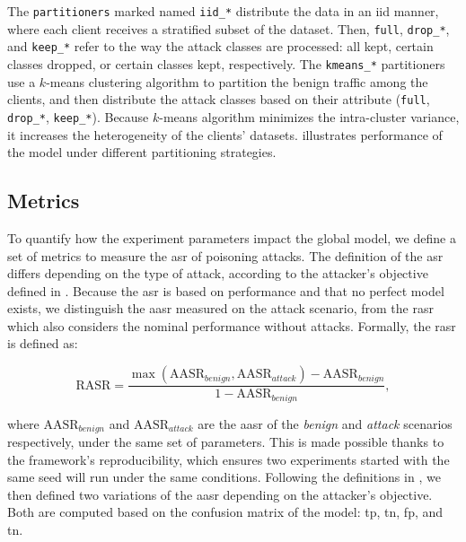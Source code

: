 
The \texttt{partitioners} marked named \texttt{iid\_*} distribute the data in an \gls{iid} manner, where each client receives a stratified\footnotemark{} subset of the dataset.
Then, \texttt{full}, \texttt{drop\_*}, and \texttt{keep\_*} refer to the way the attack classes are processed: all kept, certain classes dropped, or certain classes kept, respectively.
The \texttt{kmeans\_*} partitioners use a $k$-means clustering algorithm to partition the benign traffic among the clients, and then distribute the attack classes based on their attribute (\texttt{full}, \texttt{drop\_*}, \texttt{keep\_*}).
Because $k$-means algorithm minimizes the intra-cluster variance, it increases the heterogeneity of the clients' datasets.
 illustrates performance of the model under different partitioning strategies.



\subsection{Metrics\label{sec:assess.method.metrics}}

To quantify how the experiment parameters impact the global model, we define a set of metrics to measure the \gls{asr} of poisoning attacks.
The definition of the \gls{asr} differs depending on the type of attack, according to the attacker's objective defined in .
Because the \gls{asr} is based on performance and that no perfect model exists, we distinguish the \gls{aasr} measured on the attack scenario, from the \gls{rasr} which also considers the nominal performance without attacks.
Formally, the \gls{rasr} is defined as:

\begin{equation}
  \label{eq:rasr}
  \text{RASR} = \frac
    {\max(\text{AASR}_{benign}, \text{AASR}_{attack}) - \text{AASR}_{benign}}
    {1 - \text{AASR}_{benign}},
\end{equation}

where $\text{AASR}_{benign}$ and $\text{AASR}_{attack}$ are the \gls{aasr} of the \emph{benign} and \emph{attack} scenarios respectively, under the same set of parameters. 
This is made possible thanks to the framework's reproducibility, which ensures two experiments started with the same seed will run under the same conditions.
Following the definitions in , we then defined two variations of the \gls{aasr} depending on the attacker's objective.
Both are computed based on the confusion matrix of the model: \gls{tp}, \gls{tn}, \gls{fp}, and \gls{tn}.

